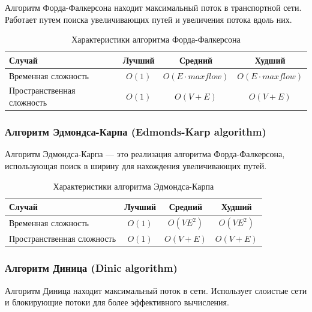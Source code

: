 \documentclass[a4paper,12pt]{article}
\begin{document}
Алгоритм Форда-Фалкерсона находит максимальный поток в транспортной сети. Работает путем поиска увеличивающих путей и увеличения потока вдоль них.

\begin{table}[H]
    \centering
    \begin{tabular}{|l|c|c|c|}
        \hline
        Случай & Лучший & Средний & Худший \\
        \hline
        Временная сложность & $O(1)$ & $O(E \cdot maxflow)$ & $O(E \cdot maxflow)$ \\
        \hline
        Пространственная сложность & $O(1)$ & $O(V + E)$ & $O(V + E)$ \\
        \hline
    \end{tabular}
    \caption{Характеристики алгоритма Форда-Фалкерсона}
\end{table}

\subsubsection{Алгоритм Эдмондса-Карпа (Edmonds-Karp algorithm)}
\label{subsubsec:алгоритм-эдмондса-карпа-edmonds-karp-algorithm}

Алгоритм Эдмондса-Карпа --- это реализация алгоритма Форда-Фалкерсона, использующая поиск в ширину для нахождения увеличивающих путей.

\begin{table}[H]
    \centering
    \begin{tabular}{|l|c|c|c|}
        \hline
        Случай & Лучший & Средний & Худший \\
        \hline
        Временная сложность & $O(1)$ & $O(VE^2)$ & $O(VE^2)$ \\
        \hline
        Пространственная сложность & $O(1)$ & $O(V + E)$ & $O(V + E)$ \\
        \hline
    \end{tabular}
    \caption{Характеристики алгоритма Эдмондса-Карпа}
\end{table}

\subsubsection{Алгоритм Диница (Dinic algorithm)}
\label{subsubsec:алгоритм-диница-dinic-algorithm}

Алгоритм Диница находит максимальный поток в сети. Использует слоистые сети и блокирующие потоки для более эффективного вычисления.
\end{document}
